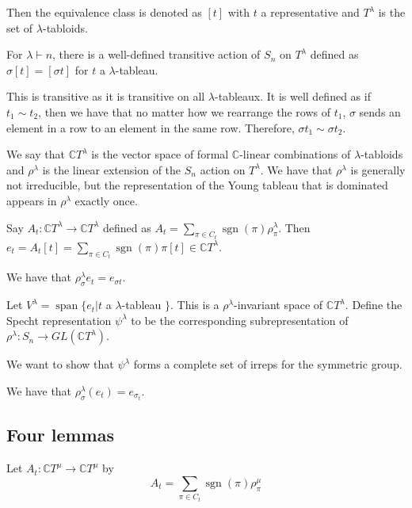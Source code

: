 \documentclass[]{report}
\theoremstyle{definition}
\numberwithin{theorem}{section}
\numberwithin{equation}{section}
\newcommand{\Span}{\operatorname{span}}
\newcommand{\sgn}{\operatorname{sgn}}
\begin{document}
Then the equivalence class is denoted as $[t]$ with $t$ a representative and $T^\lambda$ is the set of $\lambda$-tabloids. 

For $\lambda \vdash n$, there is a well-defined transitive action of $S_n$ on $T^\lambda$ defined as $\sigma[t] = [\sigma t]$ for $t$ a $\lambda$-tableau. 

This is transitive as it is transitive on all $\lambda$-tableaux. It is well defined as if $t_1 \sim t_2$, then we have that no matter how we rearrange the rows of $t_1$, $\sigma$ sends an element in a row to an element in the same row. Therefore, $\sigma t_1 \sim \sigma t_2$. 

We say that $\mathbb{C} T^\lambda$ is the vector space of formal $\mathbb{C}$-linear combinations of $\lambda$-tabloids and $\rho^\lambda$ is the linear extension of the $S_n$ action on $T^\lambda$. We have that $\rho^\lambda$ is generally not irreducible, but the representation of the Young tableau that is dominated appears in $\rho^\lambda$ exactly once. 

Say $A_t : \mathbb{C}T^\lambda \rightarrow  \mathbb{C}T^\lambda$ defined as $A_t = \sum_{\pi \in C_t} \sgn(\pi) \rho^\lambda_\pi$. 
Then $e_t = A_t[t] = \sum_{\pi \in C_t} \sgn(\pi) \pi[t] \in \mathbb{C} T^\lambda$. 

We have that $\rho_\sigma^\lambda e_t = e_{\sigma t}$.

Let $V^\lambda = \Span \lbrace e_t | t$ a $\lambda$-tableau $\rbrace$. This is a $\rho^\lambda$-invariant space of $\mathbb{C} T^\lambda$. Define the Specht representation $\psi^\lambda$ to be the corresponding subrepresentation of $\rho^\lambda: S_n \rightarrow GL(\mathbb{C} T^\lambda)$. 

We want to show that $\psi^\lambda$ forms a complete set of irreps for the symmetric group. 

We have that $\rho^\lambda_\sigma(e_t) = e_{\sigma_t}$. 



\subsection{Four lemmas}
Let $A_t : \mathbb{C}T^\mu \rightarrow \mathbb{C} T^\mu$ by 
\begin{equation}
	A_t = \sum_{\pi \in C_t} \sgn(\pi) \rho^\mu_\pi
\end{equation}
\end{document}
